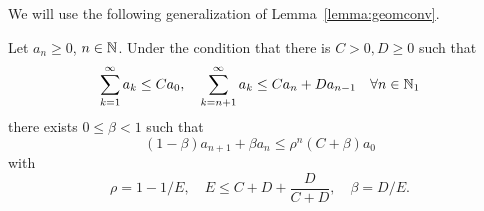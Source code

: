 \documentclass[english,12pt,a4paper]{article}
\begin{document}
%
We will use the following generalization of Lemma~\ref{lemma:geomconv}.
\begin{lemma}\label{lemma:geomconv2}
Let $a_n\ge 0$, $n\in\mathbb N$. Under the condition that there is $C>0,D\ge0$ such that
%
\begin{equation}\label{eq:geomconvhyp2}
\sum_{k=1}^{\infty} a_k \le C a_0,\quad
\sum_{k=n+1}^{\infty} a_k \le C a_n + D a_{n-1}\quad \forall n\in\mathbb N_1
\end{equation}
%
there exists $0\le \beta < 1$ such that 
%
\begin{equation}\label{eq:geomconvres2}
(1-\beta) a_{n+1} + \beta a_{n} \le  \rho^n (C+\beta)a_0
\end{equation}
%
with 
%
\begin{equation}\label{eq:}
\rho = 1 - 1/E,\quad E \le C+D + \frac{D}{C+D},\quad \beta = D/E.
\end{equation}
%
\end{lemma}
% 
\end{document}
